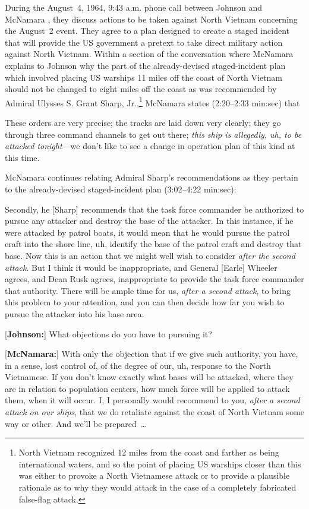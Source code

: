 \documentclass[letterpaper,12pt]{article}
\newenvironment{squote}
  {\small\quote}
  {\endquote\normalsize}
\newenvironment{squotation}
  {\small\quotation}
  {\endquotation\normalsize}
\begin{document}
During the August~4, 1964, 9:43 a.m. phone call between Johnson and McNamara \cite{JohnsonMcNamara1964-08-04am09-43}, they discuss actions to be taken against North Vietnam concerning the August~2 event. They agree to a plan designed to create a staged incident that will provide the US government a pretext to take direct military action against North Vietnam. Within a section of the conversation where McNamara explains to Johnson why the part of the already-devised staged-incident plan which involved placing US warships 11 miles off the coast of North Vietnam should not be changed to eight miles off the coast as was recommended by Admiral Ulysses S. Grant Sharp, Jr.,\footnote{North Vietnam recognized 12 miles from the coast and farther as being international waters, and so the point of placing US warships closer than this was either to provoke a North Vietnamese attack or to provide a plausible rationale as to why they would attack in the case of a completely fabricated false-flag attack.} McNamara states (2:20--2:33 min:sec) that

\begin{squote}
These orders are very precise; the tracks are laid down very clearly; they go through three command channels to get out there; \emph{this ship is allegedly, uh, to be attacked tonight}---we don't like to see a change in operation plan of this kind at this time.
\end{squote}

McNamara continues relating Admiral Sharp's recommendations as they pertain to the already-devised staged-incident plan (3:02--4:22 min:sec):

\begin{squotation}
[\textbf{McNamara:}] Secondly, he [Sharp] recommends that the task force commander be authorized to pursue any attacker and destroy the base of the attacker. In this instance, if he were attacked by patrol boats, it would mean that he would pursue the patrol craft into the shore line, uh, identify the base of the patrol craft and destroy that base. Now this is an action that we might well wish to consider \emph{after the second attack}. But I think it would be inappropriate, and General [Earle] Wheeler agrees, and Dean Rusk agrees, inappropriate to provide the task force commander that authority. There will be ample time for us, \emph{after a second attack}, to bring this problem to your attention, and you can then decide how far you wish to pursue the attacker into his base area.

[\textbf{Johnson:}] What objections do you have to pursuing it?

[\textbf{McNamara:}] With only the objection that if we give such authority, you have, in a sense, lost control of, of the degree of our, uh, response to the North Vietnamese. If you don't know exactly what bases will be attacked, where they are in relation to population centers, how much force will be applied to attack them, when it will occur. I, I personally would recommend to you, \emph{after a second attack on our ships}, that we do retaliate against the coast of North Vietnam some way or other. And we'll be prepared~\ldots
\end{squotation}
\end{document}
